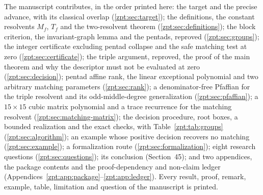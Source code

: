 \documentclass[11pt,letterpaper]{article}
\numberwithin{equation}{section}
\theoremstyle{definition}
\theoremstyle{remark}
\begin{document}
The manuscript contributes, in the order printed here: the target and the
precise advance, with its classical overlap (\cref{zpt:sec:target}); the
definitions, the constant resolvents $M_f$, $T_f$ and the two-resolvent
theorem (\cref{zpt:sec:definitions}); the block criterion, the
invariant-graph lemma and the pentads, reproved (\cref{zpt:sec:groups});
the integer certificate excluding pentad collapse and the safe matching
test at zero (\cref{zpt:sec:certificate}); the triple argument, reproved,
the proof of the main theorem and why the descriptor must not be
evaluated at zero (\cref{zpt:sec:decision}); pentad affine rank, the linear
exceptional polynomial and two arbitrary matching parameters
(\cref{zpt:sec:rank}); a denominator-free Pfaffian for the triple
resolvent and its odd-middle-degree generalization
(\cref{zpt:sec:pfaffian}); a $15\times15$ cubic matrix polynomial and a
trace recurrence for the matching resolvent
(\cref{zpt:sec:matching-matrix}); the decision procedure, root boxes, a
bounded realization and the exact checks, with
Table~\ref{zpt:tab:groups} (\cref{zpt:sec:algorithm}); an example whose
positive decision recovers no matching (\cref{zpt:sec:example}); a
formalization route (\cref{zpt:sec:formalization}); eight research
questions (\cref{zpt:sec:questions}); its conclusion (Section~45); and two
appendices, the package contents and the proof-dependency and non-claim
ledger (Appendices~\ref{zpt:app:package}--\ref{zpt:app:ledger}). Every
result, proof, remark, example, table, limitation and question of the
manuscript is printed.
\end{document}
